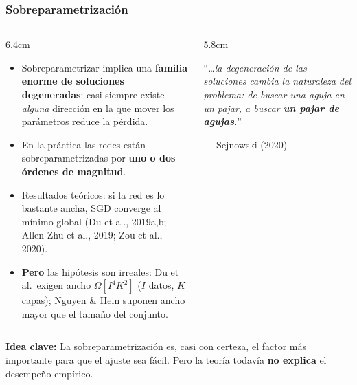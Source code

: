 \documentclass[aspectratio=169, 10pt]{beamer}
\newcommand{\idea}[1]{%
	\begin{tcolorbox}[colback=AccentGreen!6, colframe=AccentGreen, arc=3pt,
		width=\textwidth, boxsep=1pt, left=5pt, right=5pt, top=2pt, bottom=2pt,
		fontupper=\small]
		\RaggedRight\textbf{Idea clave:} #1
	\end{tcolorbox}
}
\begin{document}
\begin{frame}
\frametitle{Sobreparametrización}
\footnotesize %
\begin{columns}[T]
\begin{column}{6.4cm}
\begin{itemize}
	\item Sobreparametrizar implica una \textbf{familia enorme de soluciones degeneradas}: casi siempre existe \emph{alguna} direcci\'on en la que mover los par\'ametros reduce la p\'erdida.
	\item En la pr\'actica las redes est\'an sobreparametrizadas por \textbf{uno o dos \'ordenes de magnitud}.
	\item Resultados te\'oricos: si la red es lo bastante ancha, SGD converge al m\'inimo global (Du et al., 2019a,b; Allen-Zhu et al., 2019; Zou et al., 2020).
	\item \textbf{Pero} las hip\'otesis son irreales: Du et al.\ exigen ancho $\Omega[I^{4}K^{2}]$ ($I$ datos, $K$ capas); Nguyen \& Hein suponen ancho mayor que el tama\~no del conjunto.
\end{itemize}
\end{column}
\begin{column}{5.8cm}
\begin{tcolorbox}[colback=UCMBlue!8, colframe=UCMBlue, arc=4pt, fontupper=\small]
\RaggedRight
``\emph{{\ldots}la degeneraci\'on de las soluciones cambia la naturaleza del problema: de buscar una aguja en un pajar, a buscar \textbf{un pajar de agujas}.}''
\vspace{0.2em}

\hfill --- Sejnowski (2020)
\end{tcolorbox}
\vspace{0.4em}
\begin{center}
\end{center}
\end{column}
\end{columns}
\vspace{0.2em}
\idea{La sobreparametrizaci\'on es, casi con certeza, el factor m\'as importante para que el ajuste sea f\'acil. Pero la teor\'ia todav\'ia \textbf{no explica} el desempe\~no emp\'irico.}
\end{frame}
\end{document}
